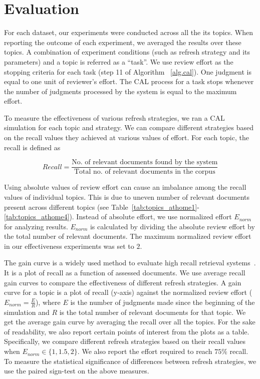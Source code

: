 \section{Evaluation}
\label{sec:eval}

For each dataset, our experiments were conducted across all the its topics.
When reporting the outcome of each experiment, we averaged the results over
these topics. A combination of experiment conditions (such as refresh strategy
and its parameters) and a topic is referred as
a ``task''. We use review effort as the stopping criteria for each task (step 11
of Algorithm ~\ref{alg.cal}). One judgment is equal to one unit of reviewer's
effort. The CAL process for a task stops whenever the number of judgments
processed by the system is equal to the maximum effort.

To measure the effectiveness of various refresh strategies, we ran a CAL simulation for
each topic and strategy. We can compare different strategies based on the recall
values they achieved at various values of effort. For each topic, the recall is
defined as

\begin{equation}
    Recall = \frac{\text{No. of relevant documents found by the system}}{\text{Total no. of
    relevant documents in the corpus}}
\end{equation}

Using absolute values of review effort can cause an imbalance among the recall
values of individual topics. This is due to uneven number of relevant documents
present across different topics (see
Table~\ref{tab:topics_athome1}-\ref{tab:topics_athome4}). Instead of
absolute effort, we use normalized effort $E_{norm}$ for analyzing results.
$E_{norm}$ is calculated by dividing the absolute review effort by the total
number of relevant documents. The maximum normalized review effort in our
effectiveness experiments was set to $2$.

The gain curve is a widely used method to evaluate high recall retrieval
systems~\cite{roegiest2015trec,grossman2016trec,grossman2011overview}. It is a
plot of recall as a function of assessed documents. We use average recall gain
curves to compare the effectiveness of different refresh strategies.  A gain
curve for a topic is a plot of recall (y-axis) against the normalized review
effort ($E_{norm} = \frac{E}{R}$), where $E$ is the number of judgments made
since the beginning of the simulation and $R$ is the total number of relevant
documents for that topic. We get the average gain curve by averaging the recall
over all the topics. For the sake of readability, we also report certain points
of interest from the plots as a table. Specifically, we compare different
refresh strategies based on their recall values when $E_{norm} \in \{1,1.5,2\}$.
We also report the effort required to reach $75\%$ recall. To measure the
statistical significance of differences between refresh strategies, we use the paired
sign-test on the above measures.

